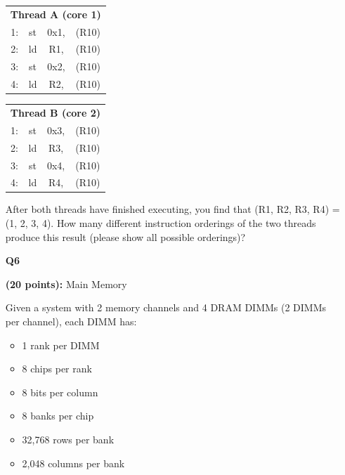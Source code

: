 \documentclass[a4paper,10pt]{article}
\begin{document}
\begin{enumerate}
{        \begin{table}[!hbpt]
        \centering
        \begin{tabular}{|cccc|}
        \hline
        \multicolumn{4}{|c|}{\textbf{Thread A (core 1)}} \\
        1:        & st        & 0x1,       & (R10)       \\
        2:        & ld        & R1,        & (R10)       \\
        3:        & st        & 0x2,       & (R10)       \\
        4:        & ld        & R2,        & (R10)       \\ \hline
        \end{tabular}
        \quad
        \quad
        \begin{tabular}{|cccc|}
        \hline
        \multicolumn{4}{|c|}{\textbf{Thread B (core 2)}} \\
        1:        & st        & 0x3,       & (R10)       \\
        2:        & ld        & R3,        & (R10)       \\
        3:        & st        & 0x4,       & (R10)       \\
        4:        & ld        & R4,        & (R10)       \\ \hline
        \end{tabular}
        \end{table}
        
        After both threads have finished executing, you find that (R1, R2, R3, R4) = (1, 2, 3, 4). 
How many different instruction orderings of the two threads produce this result (please show all possible orderings)?
        \pagebreak
    }
    \item[\textbf{Q6}]{\textbf{(20 points):} Main Memory
    
    Given a system with 2 memory channels and 4 DRAM DIMMs (2 DIMMs per channel), each DIMM has:
        
    \begin{itemize}
        \item 1 rank per DIMM
        \item 8 chips per rank
        \item 8 bits per column
        \item 8 banks per chip
        \item 32,768 rows per bank
        \item 2,048 columns per bank
    \end{itemize}


}
\end{enumerate}
\end{document}
